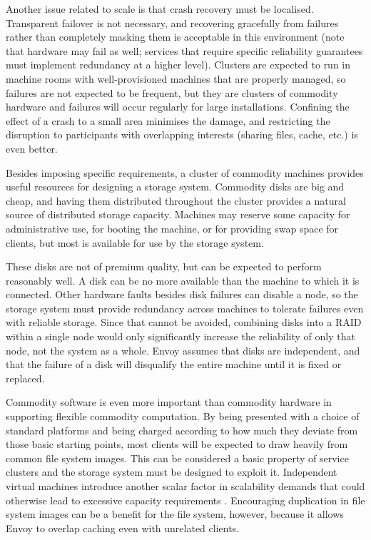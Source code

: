 Another issue related to scale is that crash recovery must be localised. Transparent failover is not necessary, and recovering gracefully from failures rather than completely masking them \cite{baker94} is acceptable in this environment (note that hardware may fail as well; services that require specific reliability guarantees must implement redundancy at a higher level). Clusters are expected to run in machine rooms with well-provisioned machines that are properly managed, so failures are not expected to be frequent, but they are clusters of commodity hardware and failures will occur regularly for large installations. Confining the effect of a crash to a small area minimises the damage, and restricting the disruption to participants with overlapping interests (sharing files, cache, etc.) is even better.

Besides imposing specific requirements, a cluster of commodity machines provides useful resources for designing a storage system. Commodity disks are big and cheap, and having them distributed throughout the cluster provides a natural source of distributed storage capacity. Machines may reserve some capacity for administrative use, for booting the machine, or for providing swap space for clients, but most is available for use by the storage system.

These disks are not of premium quality, but can be expected to perform reasonably well. A disk can be no more available than the machine to which it is connected. Other hardware faults besides disk failures can disable a node, so the storage system must provide redundancy across machines to tolerate failures even with reliable storage. Since that cannot be avoided, combining disks into a RAID within a single node would only significantly increase the reliability of only that node, not the system as a whole. Envoy assumes that disks are independent, and that the failure of a disk will disqualify the entire machine until it is fixed or replaced.

Commodity software is even more important than commodity hardware in supporting flexible commodity computation. By being presented with a choice of standard platforms and being charged according to how much they deviate from those basic starting points, most clients will be expected to draw heavily from common file system images. This can be considered a basic property of service clusters and the storage system must be designed to exploit it. Independent virtual machines introduce another scalar factor in scalability demands that could otherwise lead to excessive capacity requirements \cite{warfield}. Encouraging duplication in file system images can be a benefit for the file system, however, because it allows Envoy to overlap caching even with unrelated clients.

